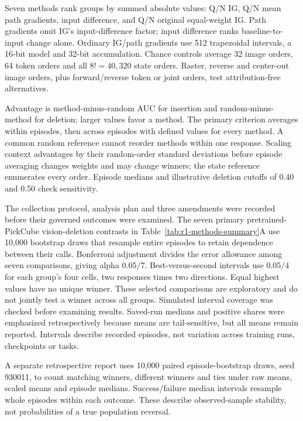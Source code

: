 \documentclass[12pt,letterpaper]{article}
\begin{document}
Seven methods rank groups by summed absolute values: Q/N IG, Q/N mean path gradients, input difference, and Q/N original equal-weight IG. Path gradients omit IG's input-difference factor; input difference ranks baseline-to-input change alone. Ordinary IG/path gradients use 512 trapezoidal intervals, a 16-bit model and 32-bit accumulation. Chance controls average 32 image orders, 64 token orders and all $8!=40{,}320$ state orders. Raster, reverse and center-out image orders, plus forward/reverse token or joint orders, test attribution-free alternatives.

Advantage is method-minus-random AUC for insertion and random-minus-method for deletion; larger values favor a method. The primary criterion averages within episodes, then across episodes with defined values for every method. A common random reference cannot reorder methods within one response. Scaling context advantages by their random-order standard deviations before episode averaging changes weights and may change winners; the state reference enumerates every order. Episode medians and illustrative deletion cutoffs of 0.40 and 0.50 check sensitivity.

The collection protocol, analysis plan and three amendments were recorded before their governed outcomes were examined. The seven primary pretrained-PickCube vision-deletion contrasts in Table~\ref{tab:r1-methods-summary}A use 10,000 bootstrap draws that resample entire episodes to retain dependence between their calls. Bonferroni adjustment divides the error allowance among seven comparisons, giving alpha $0.05/7$. Best-versus-second intervals use $0.05/4$ for each group's four cells, two responses times two directions. Equal highest values have no unique winner. These selected comparisons are exploratory and do not jointly test a winner across all groups. Simulated interval coverage was checked before examining results. Saved-run medians and positive shares were emphasized retrospectively because means are tail-sensitive, but all means remain reported. Intervals describe recorded episodes, not variation across training runs, checkpoints or tasks.

A separate retrospective report uses 10,000 paired episode-bootstrap draws, seed 930011, to count matching winners, different winners and ties under raw means, scaled means and episode medians. Success/failure median intervals resample whole episodes within each outcome. These describe observed-sample stability, not probabilities of a true population reversal.
\end{document}
